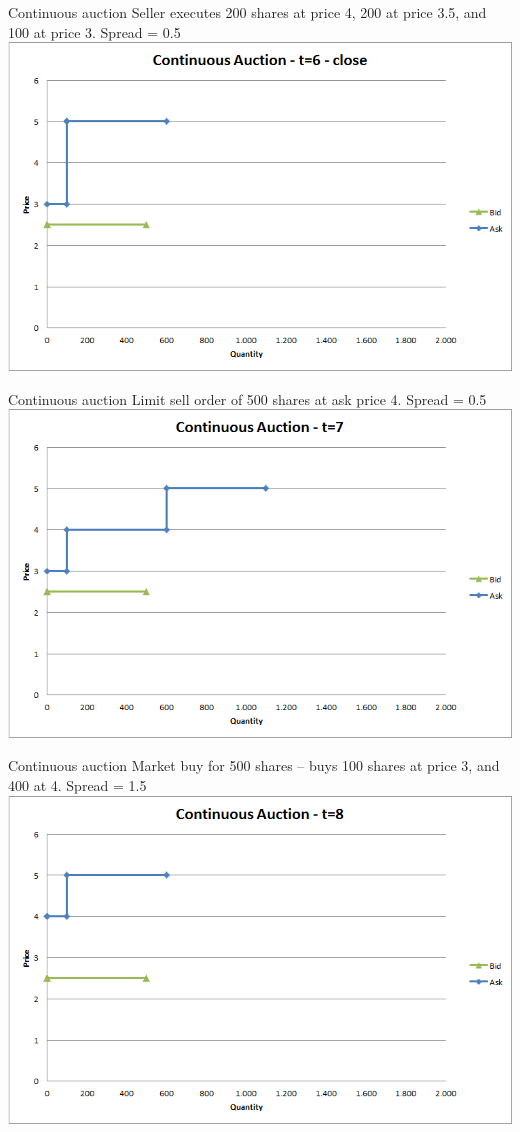 \documentclass[english,10pt
,aspectratio=169
]{beamer}
\begin{document}
\begin{frame}{Continuous auction}
	Seller executes 200 shares at price 4, 200 at price 3.5, and 100 at price 3. Spread = 0.5
	\center
	\includegraphics[width=.75\linewidth]{pics/Continuous_t6close}
\end{frame}


\begin{frame}{Continuous auction}
	Limit sell order of 500 shares at ask price 4. Spread = 0.5
	\center
	\includegraphics[width=.75\linewidth]{pics/Continuous_t7}
\end{frame}


\begin{frame}{Continuous auction}
	Market buy for 500 shares -- buys 100 shares at price 3, and 400 at 4. Spread = 1.5
	\center
	\includegraphics[width=.75\linewidth]{pics/Continuous_t8}
\end{frame}
\end{document}
